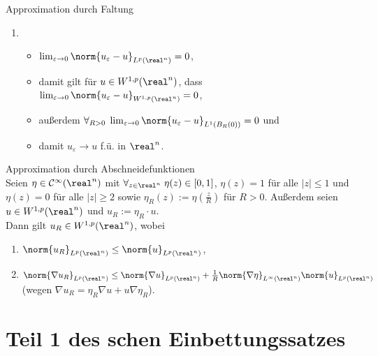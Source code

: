 \begin{Lemma}{Approximation durch Faltung}
\begin{enumerate}
        \item
        \begin{itemize}
            \item
            $\lim_{\varepsilon \to 0} \norm{u_\varepsilon - u}_{L^p(\real^n)} = 0$,

            \item
            damit gilt für $u \in W^{1,p}(\real^n)$, dass
            $\lim_{\varepsilon \to 0} \norm{u_\varepsilon - u}_{W^{1,p}(\real^n)} = 0$,

            \item
            außerdem $\forall_{R > 0}\; \lim_{\varepsilon \to 0}
            \norm{u_\varepsilon - u}_{L^1(B_R(0))} = 0$ und

            \item
            damit $u_\varepsilon \to u$ f.ü. in $\real^n$.
        \end{itemize}
    \end{enumerate}
\end{Lemma}

\begin{Lemma}{Approximation durch Abschneidefunktionen}\\
    Seien $\eta \in \C^\infty(\real^n)$ mit
    $\forall_{z \in \real^n}\; \eta(z) \in [0, 1]$,
    $\eta(z) = 1$ für alle $|z| \le 1$ und
    $\eta(z) = 0$ für alle $|z| \ge 2$
    sowie $\eta_R(z) := \eta(\frac{z}{R})$ für $R > 0$.
    Außerdem seien $u \in W^{1,p}(\real^n)$ und $u_R := \eta_R \cdot u$.\\
    Dann gilt $u_R \in W^{1,p}(\real^n)$, wobei
    \begin{enumerate}
        \item
        $\norm{u_R}_{L^p(\real^n)} \le \norm{u}_{L^p(\real^n)}$,

        \item
        $\norm{\nabla u_R}_{L^p(\real^n)} \le \norm{\nabla u}_{L^p(\real^n)} +
        \frac{1}{R} \norm{\nabla\eta}_{L^\infty(\real^n)} \norm{u}_{L^p(\real^n)}$
        (wegen $\nabla u_R = \eta_R \nabla u + u \nabla \eta_R$).
    \end{enumerate}
\end{Lemma}

\pagebreak

\section{%
    Teil 1 des schen Einbettungssatzes%
}


